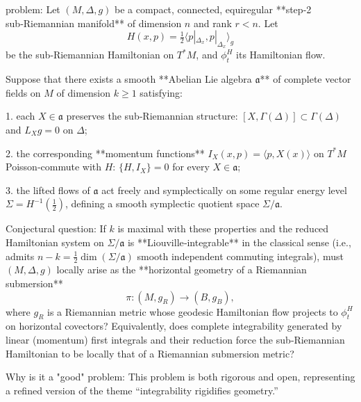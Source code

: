 problem:  
Let \((M,\Delta,g)\) be a compact, connected, equiregular **step‑2 sub‑Riemannian manifold** of dimension \(n\) and rank \(r<n\). Let  
\[
H(x,p) = \tfrac{1}{2}\langle p|_{\Delta_x},p|_{\Delta_x}\rangle_g
\]
be the sub‑Riemannian Hamiltonian on \(T^*M\), and \(\phi_t^H\) its Hamiltonian flow.

Suppose that there exists a smooth **Abelian Lie algebra \(\mathfrak{a}\)** of complete vector fields on \(M\) of dimension \(k\geq 1\) satisfying:

1. each \(X\in \mathfrak{a}\) preserves the sub‑Riemannian structure:  
   \([X,\Gamma(\Delta)]\subset \Gamma(\Delta)\) and \(L_X g=0\) on \(\Delta\);

2. the corresponding **momentum functions** \(I_X(x,p) = \langle p, X(x)\rangle\) on \(T^*M\) Poisson‑commute with \(H\): \(\{H,I_X\}=0\) for every \(X\in \mathfrak{a}\);

3. the lifted flows of \(\mathfrak{a}\) act freely and symplectically on some regular energy level \(\Sigma=H^{-1}(\tfrac12)\), defining a smooth symplectic quotient space \(\Sigma/\mathfrak{a}\).

Conjectural question:  
If \(k\) is maximal with these properties and the reduced Hamiltonian system on \(\Sigma/\mathfrak{a}\) is **Liouville‑integrable** in the classical sense (i.e., admits \(n-k=\frac12\dim(\Sigma/\mathfrak{a})\) smooth independent commuting integrals), must \((M,\Delta,g)\) locally arise as the **horizontal geometry of a Riemannian submersion**  
\[
\pi:(M,g_R)\to (B,g_B),
\]
where \(g_R\) is a Riemannian metric whose geodesic Hamiltonian flow projects to \(\phi_t^H\) on horizontal covectors?  
Equivalently, does complete integrability generated by linear (momentum) first integrals and their reduction force the sub‑Riemannian Hamiltonian to be locally that of a Riemannian submersion metric?

Why is it a "good" problem:  
This problem is both rigorous and open, representing a refined version of the theme “integrability rigidifies geometry.”  


